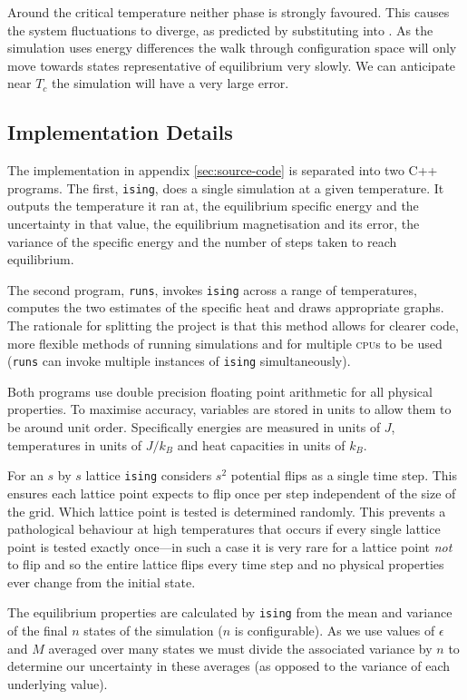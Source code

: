 \documentclass[12pt,a4paper,english]{article}
\begin{document}
Around the critical temperature neither phase is strongly favoured.  This causes the system fluctuations to diverge, as predicted by substituting  into .  As the simulation uses energy differences the walk through configuration space will only move towards states representative of equilibrium very slowly.  We can anticipate near $T_c$ the simulation will have a very large error.

\subsection{Implementation Details}
\label{sec:implementation-details}

The implementation in appendix \vref{sec:source-code} is separated into two C++ programs.  The first, \texttt{ising}, does a single simulation at a given temperature. It outputs the temperature it ran at, the equilibrium specific energy and the uncertainty in that value, the equilibrium magnetisation and its error, the variance of the specific energy and the number of steps taken to reach equilibrium.

The second program, \texttt{runs}, invokes \texttt{ising} across a range of temperatures, computes the two estimates of the specific heat and draws appropriate graphs.  The rationale for splitting the project is that this method allows for clearer code, more flexible methods of running simulations and for multiple \textsc{cpu}s to be used (\texttt{runs} can invoke multiple instances of \texttt{ising} simultaneously).

Both programs use double precision floating point arithmetic for all physical properties. To maximise accuracy, variables are stored in units to allow them to be around unit order.  Specifically energies are measured in units of $J$, temperatures in units of $J/k_B$ and heat capacities in units of $k_B$.

For an $s$ by $s$ lattice \texttt{ising} considers $s^2$ potential flips as a single time step.  This ensures each lattice point expects to flip once per step independent of the size of the grid. Which lattice point is tested is determined randomly. This prevents a pathological behaviour at high temperatures that occurs if every single lattice point is tested exactly once---in such a case it is very rare for a lattice point \emph{not} to flip and so the entire lattice flips every time step and no physical properties ever change from the initial state.

The equilibrium properties are calculated by \texttt{ising} from the mean and variance of the final $n$ states of the simulation ($n$ is configurable). As we use values of $\epsilon$ and $M$ averaged over many states we must divide the associated variance by $n$ to determine our uncertainty in these averages (as opposed to the variance of each underlying value).
\end{document}
